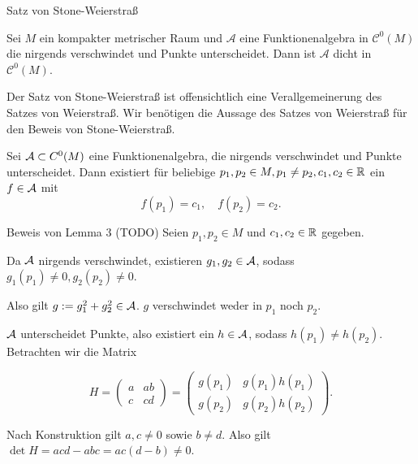 \begin{frame}{Satz von Stone-Weierstraß}
    \begin{satz}
        Sei \(M\) ein kompakter metrischer Raum und \( \mathcal{A} \) eine 
        Funktionenalgebra in \( \mathcal{C}^0(M) \) die nirgends verschwindet und 
        Punkte unterscheidet. 
        Dann ist \( \mathcal{A} \) dicht in \( \mathcal{C}^0(M) \).
    \end{satz}
    \pause
    \begin{bem}
        Der Satz von Stone-Weierstraß ist offensichtlich eine Verallgemeinerung 
        des Satzes von Weierstraß. 
        Wir benötigen die Aussage des Satzes von Weierstraß für den Beweis von Stone-Weierstraß.
    \end{bem}
\end{frame}

\begin{frame}
    \begin{lem}
        Sei \( \mathcal{A} \subset C^0(M) \) eine Funktionenalgebra, die nirgends verschwindet 
        und Punkte unterscheidet. 
        Dann existiert für beliebige \( p_1, p_2 \in M, p_1\neq p_2, 
        c_1, c_2 \in \mathbb{R} \)
        ein \(f \in \mathcal{A}\) mit 
        \[ f(p_1) = c_1, \quad f(p_2) = c_2. \]
    \end{lem}
\end{frame}

\begin{frame}{Beweis von Lemma 3 (TODO)}
    Seien \( p_1, p_2 \in M \) und \( c_1, c_2 \in \mathbb{R} \) gegeben. 
    \pause

    Da \(\mathcal{A}\) nirgends verschwindet, existieren \( g_1, g_2 \in \mathcal{A} \), 
    sodass 
    \( g_1(p_1) \neq 0, g_2(p_2) \neq 0 \). 
    \pause

    Also gilt \( g := g_1^2 + g_2^2 \in \mathcal{A} \). \(g\) verschwindet weder in \(p_1\) noch \(p_2\).
    \pause 

    \(\mathcal{A}\) unterscheidet Punkte, also existiert ein \( h \in \mathcal{A} \), sodass 
    \( h(p_1) \neq h(p_2) \).
    \pause 
    Betrachten wir die Matrix 

    \[ H = \begin{pmatrix}
        a & ab \\
        c & cd
    \end{pmatrix} = \begin{pmatrix}
        g(p_1) & g(p_1) h(p_1) \\
        g(p_2) & g(p_2) h(p_2)
    \end{pmatrix}. \]
    \pause

    Nach Konstruktion gilt 
    \( a, c \neq 0 \) sowie \(b \neq d\). Also gilt \( \det H = acd - abc = ac(d - b) \neq 0 \). 
\end{frame}

